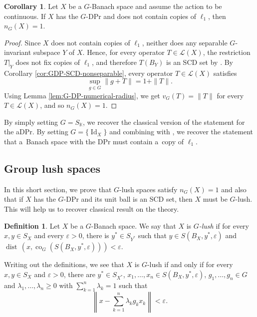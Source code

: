 \documentclass[a4paper,12pt]{amsart}
\theoremstyle{definition}
\newtheorem{corollary}[theorem]{Corollary}
\theoremstyle{definition}
\newtheorem{definition}[theorem]{Definition}
\theoremstyle{remark}
\numberwithin{equation}{section}
\newcommand{\K}{\mathbb{K}}
\DeclareMathOperator{\dist}{dist\,}
\DeclareMathOperator{\co}{co}
\DeclareMathOperator{\id}{Id}
\renewcommand{\geq}{\geqslant}
\newcommand{\<}{\langle}
\renewcommand{\>}{\rangle}
\newcommand{\e}{\varepsilon}
\begin{document}
	\begin{corollary} \label{result-contain-copies-of-l1}
		Let $X$ be a $G$-Banach space and assume the action to be continuous. If $X$ has the $G$-DPr and does not contain copies of $\ell_1$, then $n_{G}(X) = 1$.
	\end{corollary}
	
	\begin{proof}
		Since $X$ does not contain copies of $\ell_1$, neither does any separable $G$-invariant subspace $Y$ of $X$. Hence, for every operator $T \in \mathcal{L}(X)$, the restriction $T|_Y$ does not fix copies of $\ell_1$, and therefore $T(B_Y)$ is an SCD set by \cite[Examples 10.4.2]{KMRW}.
		By Corollary \ref{cor:GDP-SCD-nonseparable}, every operator $T \in \mathcal{L}(X)$ satisfies
		\begin{equation*}
			\sup_{g \in G} \|g + T\| = 1 + \|T\|.
		\end{equation*}
		Using Lemma \ref{lem:G-DP-numerical-radius}, we get $v_G(T)=\|T\|$ for every $T \in \mathcal{L}(X)$, and so $n_{G}(X)=1$. 
	\end{proof}
	
	By simply setting $G = S_\K$, we recover the classical version of the statement for the aDPr. By setting $G = \{\id_X\}$ and combining with , we recover the statement that a~Banach space with the DPr must contain a~copy of $\ell_1$.
	
	\subsection{Group lush spaces} In this short section, we prove that $G$-lush spaces satisfy $n_G(X) = 1$ and also that if $X$ has the $G$-DPr and its unit ball is an SCD set, then $X$ must be $G$-lush. This will help us to recover classical result on the theory.
	
	
	\begin{definition} Let $X$ be a $G$-Banach space. We say that $X$ is {\it $G$-lush} if for every $x, y \in S_X$ and every $\e > 0$, there is $y^* \in S_{Y^*}$ such that $y \in S(B_X, y^*, \e)$ and $\dist(x, \co_G(S(B_X, y^*, \e))) < \e$.
	\end{definition}
	
	
	Writing out the definitions, we see that $X$ is $G$-lush if and only if for every $x, y \in S_X$ and $\e>0$, there are $y^* \in S_{X^*}$, $x_1, \ldots, x_n \in S(B_X, y^*, \e)$, $g_1, \ldots, g_n \in G$ and $\lambda_1, \ldots, \lambda_n \geq 0$ with $\sum_{k=1}^n \lambda_k =1$ such that 
	\begin{equation*}
		\left\| x - \sum_{k=1}^n \lambda_k g_k x_k \right\| < \e.
	\end{equation*}
	
\end{document}
